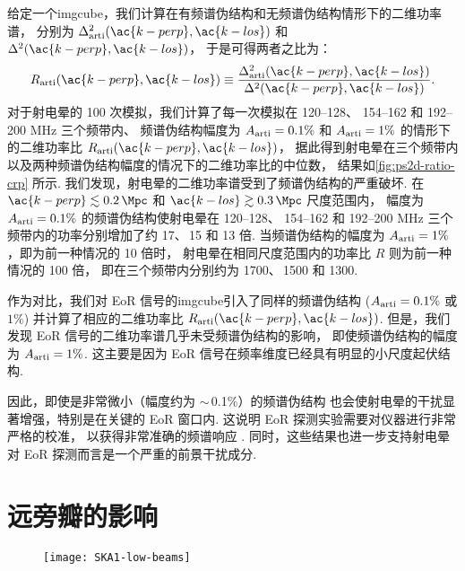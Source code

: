 给定一个\ac{imgcube}，我们计算在有频谱伪结构和无频谱伪结构情形下的二维功率谱，
分别为 $\Delta^2_{\R{arti}}(\ac{k-perp}, \ac{k-los})$ 
和 $\Delta^2(\ac{k-perp}, \ac{k-los})$，
于是可得两者之比为：
\begin{equation}
  R_{\R{arti}}(\ac{k-perp}, \ac{k-los})
    \equiv \frac{\Delta^2_{\R{arti}}(\ac{k-perp}, \ac{k-los})}{
      \Delta^2(\ac{k-perp}, \ac{k-los})} .
\end{equation}
对于射电晕的 100 次模拟，我们计算了每一次模拟在 \numrange{120}{128}、
\numrange{154}{162} 和 \numrange{192}{200} \si{\MHz} 三个频带内、
频谱伪结构幅度为 $A_{\mathrm{arti}} = 0.1\%$ 和 $A_{\mathrm{arti}} = 1\%$
的情形下的二维功率比 $R_{\R{arti}}(\ac{k-perp}, \ac{k-los})$，
据此得到射电晕在三个频带内以及两种频谱伪结构幅度的情况下的二维功率比的中位数，
结果如\autoref{fig:ps2d-ratio-crp} 所示.
我们发现，射电晕的二维功率谱受到了频谱伪结构的严重破坏.
在 $\ac{k-perp} \lesssim \SI{0.2}{\per\Mpc}$ 和
$\ac{k-los} \gtrsim \SI{0.3}{\per\Mpc}$ 尺度范围内，
幅度为 $A_{\mathrm{arti}} = 0.1\%$ 的频谱伪结构使射电晕在 \numrange{120}{128}、
\numrange{154}{162} 和 \numrange{192}{200} \si{\MHz}
三个频带内的功率分别增加了约 17、\,15 和 13 倍.
当频谱伪结构的幅度为 $A_{\mathrm{arti}} = 1\%$，即为前一种情况的 10 倍时，
射电晕在相同尺度范围内的功率比 $R$ 则为前一种情况的 100 倍，
即在三个频带内分别约为 1700、\,1500 和 1300.

作为对比，我们对 EoR 信号的\ac{imgcube}引入了同样的频谱伪结构
($A_{\mathrm{arti}} = 0.1\%$ 或 $1\%$)
并计算了相应的二维功率比 $R_{\R{arti}}(\ac{k-perp}, \ac{k-los})$.
但是，我们发现 EoR 信号的二维功率谱几乎未受频谱伪结构的影响，
即使频谱伪结构的幅度为 $A_{\mathrm{arti}} = 1\%$.
这主要是因为 EoR 信号在频率维度已经具有明显的小尺度起伏结构.

因此，即使是非常微小（幅度约为 $\sim$\,0.1\%）的频谱伪结构
也会使射电晕的干扰显著增强，特别是在关键的 EoR 窗口内.
这说明 EoR 探测实验需要对仪器进行非常严格的校准，
以获得非常准确的频谱响应 \cite{barry2016}.
同时，这些结果也进一步支持射电晕对 EoR 探测而言是一个严重的前景干扰成分.


\section{远旁瓣的影响}
\label{sec:fscn}

\begin{figure}[htp]
  \centering
  \texttt{[image: SKA1-low-beams]}
  \label{fig:ska-beams}
\end{figure}

